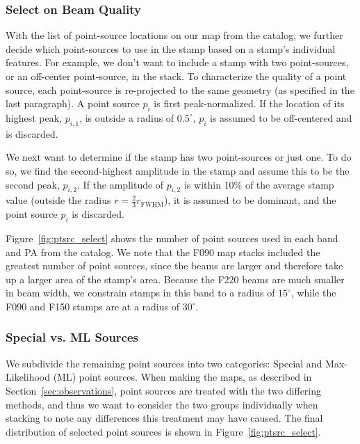 \subsubsection{Select on Beam Quality}
\label{subsubsec:beamqual_sel}
With the list of point-source locations on our map from the catalog, we further decide which point-sources to use in the stamp based on a stamp's individual features.  For example, we don't want to include a stamp with two point-sources, or an off-center point-source, in the stack.  To characterize the quality of a point source, each point-source is re-projected to the same geometry (as specified in the last paragraph).  A point source $p_i$ is first peak-normalized.  If the location of its highest peak, $p_{i,1}$, is outside a radius of $0.5^{\circ}$, $p_i$ is assumed to be off-centered and is discarded.  

We next want to determine if the stamp has two point-sources or just one.  To do so, we find the second-highest amplitude in the stamp and assume this to be the second peak, $p_{i,2}$.  If the amplitude of $p_{i,2}$ is within 10\% of the average stamp value (outside the radius $r=\frac{2}{3}r_{\text{FWHM}}$), it is assumed to be dominant, and the point source $p_i$ is discarded.

Figure~\ref{fig:ptsrc_select} shows the number of point sources used in each band and PA from the catalog.  We note that the F090 map stacks included the greatest number of point sources, since the beams are larger and therefore take up a larger area of the stamp's area.  Because the F220 beams are much smaller in beam width, we constrain stamps in this band to a radius of $15^{\circ}$, while the F090 and F150 stamps are at a radius of $30^{\circ}$.

\subsubsection{Special vs. ML Sources}
\label{subsubsec:type_sel}
We subdivide the remaining point sources into two categories: Special and Max-Likelihood (ML) point sources.  When making the maps, as described in Section~\ref{sec:observations}, point sources are treated with the two differing methods, and thus we want to consider the two groups individually when stacking to note any differences this treatment may have caused.  The final distribution of selected point sources is shown in Figure~\ref{fig:ptsrc_select}.

